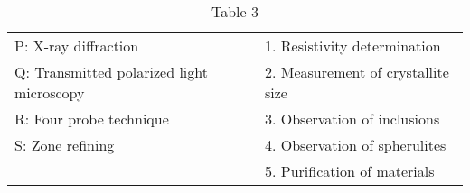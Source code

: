 \begin{table}[htbp]

\caption{Table-3}
\label{tab:tables/table3.tex}
\begin{tabular}{l l}
P: X-ray diffraction & 1. Resistivity determination \\
Q: Transmitted polarized light microscopy & 2. Measurement of crystallite size \\
R: Four probe technique & 3. Observation of inclusions \\
S: Zone refining & 4. Observation of spherulites \\
& 5. Purification of materials \\
\end{tabular}

\end{table}